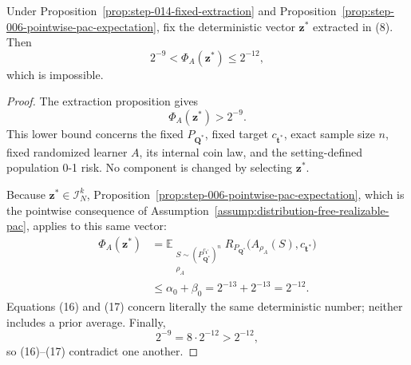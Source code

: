 \begin{proposition}\label{prop:step-014-fixed-contradiction}
Under Proposition~\ref{prop:step-014-fixed-extraction} and Proposition~\ref{prop:step-006-pointwise-pac-expectation}, fix the
deterministic vector \(\boldsymbol z^*\) extracted in (8). Then
\[
2^{-9}<\Phi_A(\boldsymbol z^*)\le2^{-12},
\tag{15}
\]
which is impossible.
\end{proposition}

\begin{proof}
The extraction proposition gives
\[
\Phi_A(\boldsymbol z^*)>2^{-9}.
\tag{16}
\]
This lower bound concerns the fixed \(P_{\boldsymbol Q^*}\), fixed target
\(c_{\boldsymbol t^*}\), exact sample size \(n\), fixed randomized learner
\(A\), its internal coin law, and the setting-defined population 0-1 risk.
No component is changed by selecting \(\boldsymbol z^*\).

Because \(\boldsymbol z^*\in\mathcal I_N^k\), Proposition~\ref{prop:step-006-pointwise-pac-expectation}, which is the
pointwise consequence of Assumption~\ref{assump:distribution-free-realizable-pac},
applies to this same vector:
\[
\begin{aligned}
\Phi_A(\boldsymbol z^*)
&=\mathbb E_{\substack{
  S\sim(P_{\boldsymbol Q^*}^{c_{\boldsymbol t^*}})^n\\ \rho_A}}
  R_{P_{\boldsymbol Q^*}}\bigl(A_{\rho_A}(S),c_{\boldsymbol t^*}\bigr)\\
&\le\alpha_0+\beta_0
=2^{-13}+2^{-13}=2^{-12}.
\end{aligned}
\tag{17}
\]
Equations (16) and (17) concern literally the same deterministic number;
neither includes a prior average. Finally,
\[
2^{-9}=8\cdot2^{-12}>2^{-12},
\tag{18}
\]
so (16)--(17) contradict one another. \end{proof}
